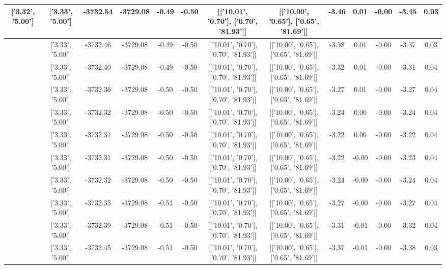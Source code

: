 \begin{table}[htbp]
\begin{adjustbox}{angle=90}
\begin{tabular}{|c|c|c|c|c|c|c|c|c|c|c|c|c|}
 ['3.32', '5.00'] & ['3.33', '5.00'] & -3732.54 & -3729.08 & -0.49 & -0.50 & [['10.01', '0.70'], ['0.70', '81.93']] & [['10.00', '0.65'], ['0.65', '81.69']] & -3.46 & 0.01 & -0.00 & -3.45 & 0.03\\ \hline
 ['3.33', '5.00'] & ['3.33', '5.00'] & -3732.46 & -3729.08 & -0.49 & -0.50 & [['10.01', '0.70'], ['0.70', '81.93']] & [['10.00', '0.65'], ['0.65', '81.69']] & -3.38 & 0.01 & -0.00 & -3.37 & 0.03\\ \hline
 ['3.33', '5.00'] & ['3.33', '5.00'] & -3732.40 & -3729.08 & -0.49 & -0.50 & [['10.01', '0.70'], ['0.70', '81.93']] & [['10.00', '0.65'], ['0.65', '81.69']] & -3.32 & 0.01 & -0.00 & -3.31 & 0.04\\ \hline
 ['3.33', '5.00'] & ['3.33', '5.00'] & -3732.36 & -3729.08 & -0.50 & -0.50 & [['10.01', '0.70'], ['0.70', '81.93']] & [['10.00', '0.65'], ['0.65', '81.69']] & -3.27 & 0.01 & -0.00 & -3.27 & 0.04\\ \hline
 ['3.33', '5.00'] & ['3.33', '5.00'] & -3732.32 & -3729.08 & -0.50 & -0.50 & [['10.01', '0.70'], ['0.70', '81.93']] & [['10.00', '0.65'], ['0.65', '81.69']] & -3.24 & 0.00 & -0.00 & -3.24 & 0.04\\ \hline
 ['3.33', '5.00'] & ['3.33', '5.00'] & -3732.31 & -3729.08 & -0.50 & -0.50 & [['10.01', '0.70'], ['0.70', '81.93']] & [['10.00', '0.65'], ['0.65', '81.69']] & -3.22 & 0.00 & -0.00 & -3.22 & 0.04\\ \hline
 ['3.33', '5.00'] & ['3.33', '5.00'] & -3732.31 & -3729.08 & -0.50 & -0.50 & [['10.01', '0.70'], ['0.70', '81.93']] & [['10.00', '0.65'], ['0.65', '81.69']] & -3.22 & -0.00 & -0.00 & -3.23 & 0.04\\ \hline
 ['3.33', '5.01'] & ['3.33', '5.00'] & -3732.32 & -3729.08 & -0.50 & -0.50 & [['10.01', '0.70'], ['0.70', '81.93']] & [['10.00', '0.65'], ['0.65', '81.69']] & -3.24 & -0.00 & -0.00 & -3.24 & 0.04\\ \hline
 ['3.33', '5.01'] & ['3.33', '5.00'] & -3732.35 & -3729.08 & -0.51 & -0.50 & [['10.01', '0.70'], ['0.70', '81.93']] & [['10.00', '0.65'], ['0.65', '81.69']] & -3.27 & -0.00 & -0.00 & -3.27 & 0.04\\ \hline
 ['3.33', '5.01'] & ['3.33', '5.00'] & -3732.39 & -3729.08 & -0.51 & -0.50 & [['10.01', '0.70'], ['0.70', '81.93']] & [['10.00', '0.65'], ['0.65', '81.69']] & -3.31 & -0.01 & -0.00 & -3.32 & 0.04\\ \hline
 ['3.34', '5.01'] & ['3.33', '5.00'] & -3732.45 & -3729.08 & -0.51 & -0.50 & [['10.01', '0.70'], ['0.70', '81.93']] & [['10.00', '0.65'], ['0.65', '81.69']] & -3.37 & -0.01 & -0.00 & -3.38 & 0.03\\ \hline

\end{tabular}
\end{adjustbox}
\end{table}
